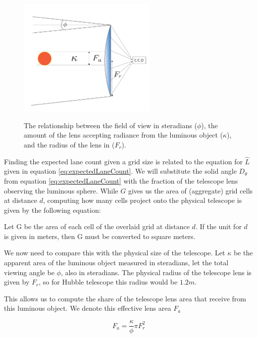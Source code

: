 \documentclass[notitlepage]{article}
\begin{document}
\begin{figure}
\centering
{\includegraphics[width=0.6\textwidth, trim={0cm 0cm 0cm 0cm},clip]{illustrations/CameraLens.pdf}}
\caption{The relationship between the field of view in steradians ($\phi $), the amount of the lens accepting radiance from the luminous object ($\kappa $), and the radius of the lens in  ($F_r$).}
\label{hubbleLens}

\end{figure}

Finding the expected lane count given a grid size is related to the equation for $\hat{L}$ given in equation \eqref{eq:expectedLaneCount}. We will substitute the solid angle $D_\theta$ from equation  \eqref{eq:expectedLaneCount} with the fraction of the telescope lens observing the luminous sphere. While $G$ gives us the area of (aggregate) grid cells at distance $d$, computing how many cells project onto the physical telescope is given by the following equation:

Let G be the area of each cell of the overlaid grid at distance $d$. If the unit for $d$ is given in meters, then G must be converted to square meters.

We now need to compare this with the physical size of the telescope. Let $\kappa$ be the apparent area of the luminous object measured in steradians,  let the total viewing angle be $\phi$, also in steradians. The physical radius of the telescope lens is given by $F_r$, so for Hubble telescope this radius would be $1.2m$.

This allows us to compute the share of the telescope lens area that receive from this luminous object. We denote this effective lens area $F_a$ 

\begin{equation}
F_a  =  \frac{\kappa  }{\phi} \pi F_r^2
 \label{eq:Kappa}
\end{equation}
\end{document}
